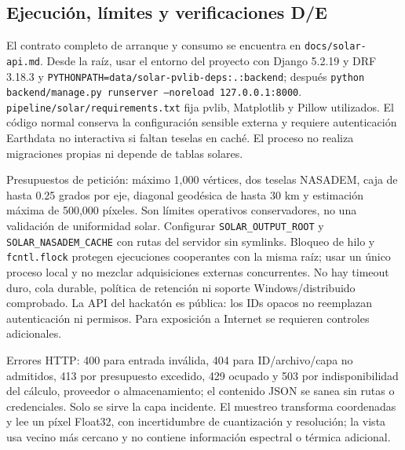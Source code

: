 \documentclass[11pt,a4paper]{article}
\begin{document}
\subsection{Ejecución, límites y verificaciones D/E}
El contrato completo de arranque y consumo se encuentra en \texttt{docs/solar-api.md}. Desde la raíz, usar el entorno del proyecto con Django 5.2.19 y DRF 3.18.3 y \texttt{PYTHONPATH=data/solar-pvlib-deps:.:backend}; después \texttt{python backend/manage.py runserver --noreload 127.0.0.1:8000}. \texttt{pipeline/solar/requirements.txt} fija pvlib, Matplotlib y Pillow utilizados. El código normal conserva la configuración sensible externa y requiere autenticación Earthdata no interactiva si faltan teselas en caché. El proceso no realiza migraciones propias ni depende de tablas solares.

Presupuestos de petición: máximo 1{,}000 vértices, dos teselas NASADEM, caja de hasta 0.25 grados por eje, diagonal geodésica de hasta 30 km y estimación máxima de 500{,}000 píxeles. Son límites operativos conservadores, no una validación de uniformidad solar. Configurar \texttt{SOLAR\_OUTPUT\_ROOT} y \texttt{SOLAR\_NASADEM\_CACHE} con rutas del servidor sin symlinks. Bloqueo de hilo y \texttt{fcntl.flock} protegen ejecuciones cooperantes con la misma raíz; usar un único proceso local y no mezclar adquisiciones externas concurrentes. No hay timeout duro, cola durable, política de retención ni soporte Windows/distribuido comprobado. La API del hackatón es pública: los IDs opacos no reemplazan autenticación ni permisos. Para exposición a Internet se requieren controles adicionales.

Errores HTTP: 400 para entrada inválida, 404 para ID/archivo/capa no admitidos, 413 por presupuesto excedido, 429 ocupado y 503 por indisponibilidad del cálculo, proveedor o almacenamiento; el contenido JSON se sanea sin rutas o credenciales. Solo se sirve la capa incidente. El muestreo transforma coordenadas y lee un píxel Float32, con incertidumbre de cuantización y resolución; la vista usa vecino más cercano y no contiene información espectral o térmica adicional.
\end{document}
